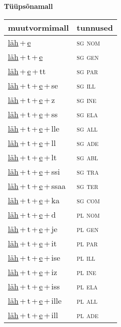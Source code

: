 
\vspace{1.8em}
\begin{minipage}{\textwidth}
\textbf{Tüüpsõnamall \,}\\

\begin{sideways}
\begin{tabular}{l l}
muutvormimall & tunnused \\
\hline
\underline{läh}\,+\,\underline{e} & \textsc{ sg nom } \\
\underline{läh}\,+\,t\,+\,\underline{e} & \textsc{ sg gen } \\
\underline{läh}\,+\,\underline{e}\,+\,tt & \textsc{ sg par } \\
\underline{läh}\,+\,t\,+\,\underline{e}\,+\,se & \textsc{ sg ill } \\
\underline{läh}\,+\,t\,+\,\underline{e}\,+\,z & \textsc{ sg ine } \\
\underline{läh}\,+\,t\,+\,\underline{e}\,+\,ss & \textsc{ sg ela } \\
\underline{läh}\,+\,t\,+\,\underline{e}\,+\,lle & \textsc{ sg all } \\
\underline{läh}\,+\,t\,+\,\underline{e}\,+\,ll & \textsc{ sg ade } \\
\underline{läh}\,+\,t\,+\,\underline{e}\,+\,lt & \textsc{ sg abl } \\
\underline{läh}\,+\,t\,+\,\underline{e}\,+\,ssi & \textsc{ sg tra } \\
\underline{läh}\,+\,t\,+\,\underline{e}\,+\,ssaa & \textsc{ sg ter } \\
\underline{läh}\,+\,t\,+\,\underline{e}\,+\,ka & \textsc{ sg com } \\
\underline{läh}\,+\,t\,+\,\underline{e}\,+\,d & \textsc{ pl nom } \\
\underline{läh}\,+\,t\,+\,\underline{e}\,+\,je & \textsc{ pl gen } \\
\underline{läh}\,+\,t\,+\,\underline{e}\,+\,it & \textsc{ pl par } \\
\underline{läh}\,+\,t\,+\,\underline{e}\,+\,ise & \textsc{ pl ill } \\
\underline{läh}\,+\,t\,+\,\underline{e}\,+\,iz & \textsc{ pl ine } \\
\underline{läh}\,+\,t\,+\,\underline{e}\,+\,iss & \textsc{ pl ela } \\
\underline{läh}\,+\,t\,+\,\underline{e}\,+\,ille & \textsc{ pl all } \\
\underline{läh}\,+\,t\,+\,\underline{e}\,+\,ill & \textsc{ pl ade } \\

\end{tabular}
\end{sideways}
\end{minipage}

